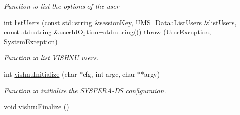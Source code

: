 \begin{DoxyCompactItemize}
\begin{DoxyCompactList}\small\item\em Function to list the options of the user. \item\end{DoxyCompactList}\item 
int \hyperlink{namespacevishnu_a6a0175686b0d2aff434015fc61c62ce6}{listUsers} (const std::string \&sessionKey, UMS\_\-Data::ListUsers \&listUsers, const std::string \&userIdOption=std::string())  throw (UserException, SystemException)
\begin{DoxyCompactList}\small\item\em Function to list VISHNU users. \item\end{DoxyCompactList}\item 
int \hyperlink{namespacevishnu_adc7892040980c12dd70ed3228f350313}{vishnuInitialize} (char $\ast$cfg, int argc, char $\ast$$\ast$argv)
\begin{DoxyCompactList}\small\item\em Function to initialize the SYSFERA-\/DS configuration. \item\end{DoxyCompactList}\item 
\hypertarget{namespacevishnu_a5ef439295f52f8055a0771ae9f257b68}{
void \hyperlink{namespacevishnu_a5ef439295f52f8055a0771ae9f257b68}{vishnuFinalize} ()}
\label{namespacevishnu_a5ef439295f52f8055a0771ae9f257b68}


\end{DoxyCompactItemize}
